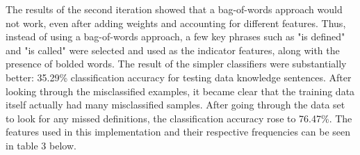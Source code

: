 \documentclass{article} %
\begin{document}
The results of the second iteration showed that a bag-of-words approach would not work, even after adding weights and accounting for different features. Thus, instead of using a bag-of-words approach, a few key phrases such as "is defined" and "is called" were selected and used as the indicator features, along with the presence of bolded words. The result of the simpler classifiers were substantially better: 35.29\% classification accuracy for testing data knowledge sentences. After looking through the misclassified examples, it became clear that the training data itself actually had many misclassified samples. After going through the data set to look for any missed definitions, the classification accuracy rose to 76.47\%. The features used in this implementation and their respective frequencies can be seen in table 3 below.
\end{document}
